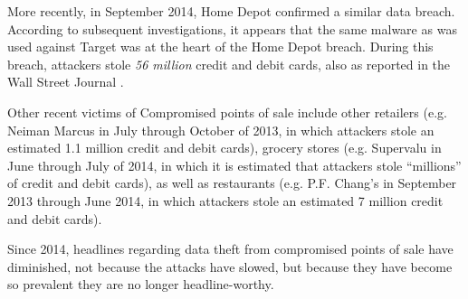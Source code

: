 More recently, in September 2014, Home Depot confirmed a similar data breach.
According to subsequent investigations, it appears that the same malware as was used against Target was at the heart of the Home Depot breach.
During this breach, attackers stole \emph{56 million} credit and debit cards, also as reported in the Wall Street Journal \cite{homedepothack}.

Other recent victims of Compromised points of sale include other retailers
	(e.g. Neiman Marcus in July through October of 2013, in which attackers stole an estimated 1.1 million credit and debit cards)\cite{neimanmarcushack},
	grocery stores (e.g. Supervalu in June through July of 2014, in which it is estimated that attackers stole ``millions'' of credit and debit cards\cite{supervaluhack}),
	as well as restaurants (e.g. P.F. Chang's in September 2013 through June 2014, in which attackers stole an estimated 7 million credit and debit cards\cite{pfchanghack}).

Since 2014, headlines regarding data theft from compromised points of sale have diminished,
    not because the attacks have slowed, but because they have become so prevalent they are no longer headline-worthy.
